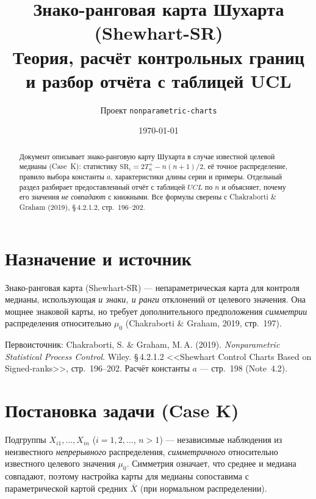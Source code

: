 \documentclass[11pt,a4paper]{article}
\title{\textbf{Знако-ранговая карта Шухарта (Shewhart-SR)}\\[2pt]
\large Теория, расчёт контрольных границ и разбор отчёта с таблицей UCL}
\author{Проект \texttt{nonparametric-charts}}
\date{\today}
\newcommand{\SR}{\mathrm{SR}}
\begin{document}
\maketitle

\begin{abstract}
\noindent
Документ описывает знако-ранговую карту Шухарта в случае известной целевой
медианы (Case~K): статистику $\SR_i=2T_n^{+}-n(n+1)/2$, её точное
распределение, правило выбора константы $a$, характеристики длины серии и
примеры. Отдельный раздел разбирает предоставленный отчёт с таблицей
$UCL$ по $n$ и объясняет, почему его значения \emph{не совпадают} с
книжными. Все формулы сверены с Chakraborti \& Graham (2019),
\S\,4.2.1.2, стр.~196--202.
\end{abstract}

\tableofcontents
\bigskip

\section{Назначение и источник}

Знако-ранговая карта (Shewhart-SR) --- непараметрическая карта для
контроля медианы, использующая \emph{и знаки, и ранги} отклонений от
целевого значения. Она мощнее знаковой карты, но требует
дополнительного предположения \emph{симметрии} распределения
относительно $\mu_0$ (Chakraborti \& Graham, 2019, стр.~197).

Первоисточник: Chakraborti, S. \& Graham, M.\,A. (2019).
\textit{Nonparametric Statistical Process Control}. Wiley.
\S\,4.2.1.2 <<Shewhart Control Charts Based on Signed-ranks>>,
стр.~196--202. Расчёт константы $a$ --- стр.~198 (Note~4.2).

\section{Постановка задачи (Case K)}

Подгруппы $X_{i1},\dots,X_{in}$ ($i=1,2,\dots$, $n>1$) --- независимые
наблюдения из неизвестного \emph{непрерывного} распределения,
\emph{симметричного} относительно известного целевого значения $\mu_0$.
Симметрия означает, что среднее и медиана совпадают, поэтому настройка
карты для медианы сопоставима с параметрической картой средних
$\bar X$ (при нормальном распределении).
\end{document}
